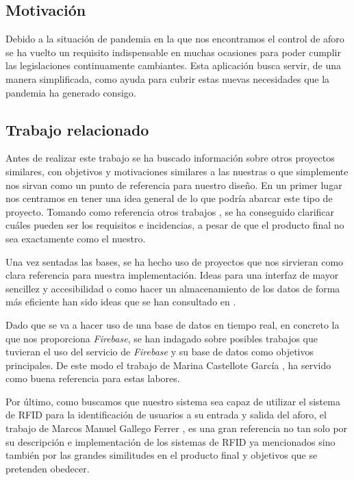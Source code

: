 \documentclass[a4paper,openright,12pt]{article}
\begin{document}
\subsection{Motivación}
Debido a la situación de pandemia en la que nos encontramos el control de aforo se ha vuelto un requisito indispensable en muchas ocasiones para poder cumplir las legislaciones continuamente cambiantes. Esta aplicación busca servir, de una manera simplificada, como ayuda para cubrir estas nuevas necesidades que la pandemia ha generado consigo.

\subsection{Trabajo relacionado}
Antes de realizar este trabajo se ha buscado información sobre otros proyectos similares, con objetivos y motivaciones similares a las nuestras o que simplemente nos sirvan como un punto de referencia para nuestro diseño.
En un primer lugar nos centramos en tener una idea general de lo que podría abarcar este tipo de proyecto. Tomando como referencia otros trabajos \cite{TFG_bares}, se ha conseguido clarificar cuáles pueden ser los requisitos e incidencias, a pesar de que el producto final no sea exactamente como el nuestro. \par
Una vez sentadas las bases, se ha hecho uso de proyectos que nos sirvieran como clara referencia para nuestra implementación. Ideas para una interfaz de mayor sencillez y accesibilidad o como hacer un almacenamiento de los datos de forma más eficiente han sido ideas que se han consultado en \cite{TFG_complu}. \par
Dado que se va a hacer uso de una base de datos en tiempo real, en concreto la que nos proporciona \textit{Firebase}, se han indagado sobre posibles trabajos que tuvieran el uso del servicio de \textit{Firebase} y su base de datos como objetivos principales. De este modo el trabajo de Marina Castellote García \cite{TFG_apuestas}, ha servido como buena referencia para estas labores. \par
Por último, como buscamos que nuestro sistema sea capaz de utilizar el sistema de RFID para la identificación de usuarios a su entrada y salida del aforo, el trabajo de Marcos Manuel Gallego Ferrer \cite{Safe-Events}, es una gran referencia no tan solo por su descripción e implementación de los sistemas de RFID ya mencionados sino también por las grandes similitudes en el producto final y objetivos que se pretenden obedecer.
\end{document}
